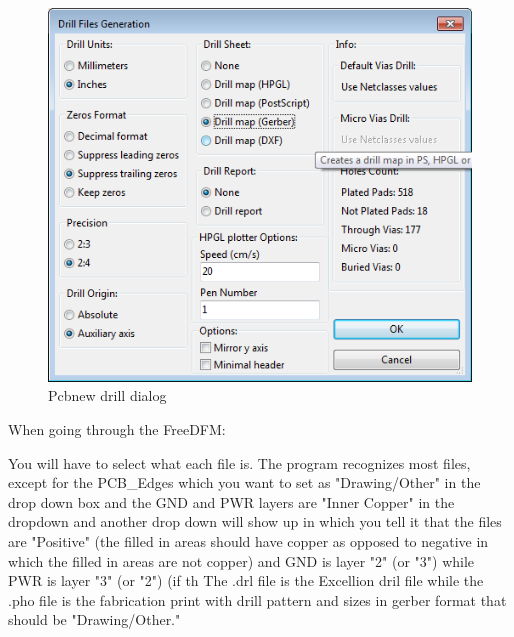 \begin{figure}[H]
	\centering 
		\includegraphics{./figures/drilldialog} 
	\caption{Pcbnew drill dialog\label{fig:drilldialog}}
\end{figure}

When going through the FreeDFM:

You will have to select what each file is.  The program recognizes most files, except for the PCB\_Edges which you want to set as "Drawing/Other" in the drop down box and the GND and PWR layers are "Inner Copper" in the dropdown and another drop down will show up in which you tell it that the files are "Positive" (the filled in areas should have copper as opposed to negative in which the filled in areas are not copper) and GND is layer "2" (or "3") while PWR is layer "3" (or "2") (if th  The .drl file is the Excellion dril file while the .pho file is the fabrication print with drill pattern and sizes in gerber format that should be "Drawing/Other."  %


